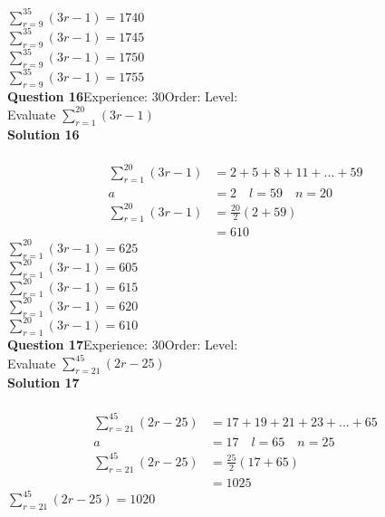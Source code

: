 \documentclass{article}
\begin{document}
$\displaystyle\sum_{r=9}^{35} (3r-1)=1740$\\
$\displaystyle\sum_{r=9}^{35} (3r-1)=1745$\\
$\displaystyle\sum_{r=9}^{35} (3r-1)=1750$\\
$\displaystyle\sum_{r=9}^{35} (3r-1)=1755$\\
\noindent\textbf{Question 16}\hspace{20pt}Experience: 30\hspace{20pt}Order: \hspace{20pt}Level: \\[2pt]
Evaluate $\displaystyle\sum_{r=1}^{20} (3r-1)$\\[4pt]
\noindent\textbf{Solution 16}\\[2pt]
\\[-10pt]\begin{align*}
\displaystyle\sum_{r=1}^{20} (3r-1)&=2+5+8+11+...+59\\[2pt]
a&=2\quad l=59 \quad n=20\\[2pt]
\displaystyle\sum_{r=1}^{20} (3r-1)&=\displaystyle\frac{20}{2}(2+59)\\[2pt]
&=610
\end{align*}
$\displaystyle\sum_{r=1}^{20} (3r-1)=625$\\
$\displaystyle\sum_{r=1}^{20} (3r-1)=605$\\
$\displaystyle\sum_{r=1}^{20} (3r-1)=615$\\
$\displaystyle\sum_{r=1}^{20} (3r-1)=620$\\
$\displaystyle\sum_{r=1}^{20} (3r-1)=610$\\
\noindent\textbf{Question 17}\hspace{20pt}Experience: 30\hspace{20pt}Order: \hspace{20pt}Level: \\[2pt]
Evaluate $\displaystyle\sum_{r=21}^{45} (2r-25)$\\[4pt]
\noindent\textbf{Solution 17}\\[2pt]
\\[-10pt]\begin{align*}
\displaystyle\sum_{r=21}^{45} (2r-25)&=17+19+21+23+...+65\\[2pt]
a&=17\quad l=65 \quad n=25\\[2pt]
\displaystyle\sum_{r=21}^{45} (2r-25)&=\displaystyle\frac{25}{2}(17+65)\\[2pt]
&=1025
\end{align*}
$\displaystyle\sum_{r=21}^{45} (2r-25)=1020$\\
\end{document}
